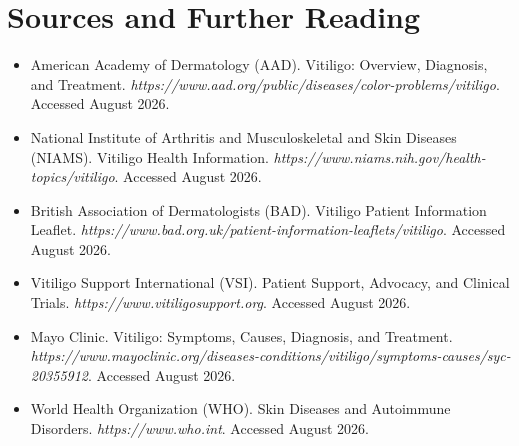 \section*{Sources and Further Reading}
\begin{itemize}
    \item American Academy of Dermatology (AAD). Vitiligo: Overview, Diagnosis, and Treatment. \textit{https://www.aad.org/public/diseases/color-problems/vitiligo}. Accessed August 2026.
    \item National Institute of Arthritis and Musculoskeletal and Skin Diseases (NIAMS). Vitiligo Health Information. \textit{https://www.niams.nih.gov/health-topics/vitiligo}. Accessed August 2026.
    \item British Association of Dermatologists (BAD). Vitiligo Patient Information Leaflet. \textit{https://www.bad.org.uk/patient-information-leaflets/vitiligo}. Accessed August 2026.
    \item Vitiligo Support International (VSI). Patient Support, Advocacy, and Clinical Trials. \textit{https://www.vitiligosupport.org}. Accessed August 2026.
    \item Mayo Clinic. Vitiligo: Symptoms, Causes, Diagnosis, and Treatment. \textit{https://www.mayoclinic.org/diseases-conditions/vitiligo/symptoms-causes/syc-20355912}. Accessed August 2026.
    \item World Health Organization (WHO). Skin Diseases and Autoimmune Disorders. \textit{https://www.who.int}. Accessed August 2026.
\end{itemize}